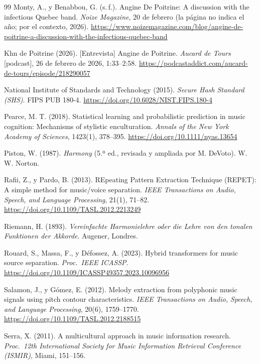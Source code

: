 \begin{thebibliography}{99}
Monty, A., y Benabbou, G. (s.\,f.). Angine De Poitrine: A discussion with the infectious Quebec band. \emph{Noize
Magazine}, 20 de febrero (la página no indica el año; por el contexto, 2026).
\url{https://www.noizemagazine.com/blog/angine-de-poitrine-a-discussion-with-the-infectious-quebec-band}

Khn de Poitrine (2026). [Entrevista] Angine de Poitrine. \emph{Aucard de Tours} [podcast], 26 de febrero de 2026,
1:33--2:58. \url{https://podcastaddict.com/aucard-de-tours/episode/218290057}

National Institute of Standards and Technology (2015). \emph{Secure Hash Standard (SHS)}. FIPS PUB 180-4.
\url{https://doi.org/10.6028/NIST.FIPS.180-4}

Pearce, M. T. (2018). Statistical learning and probabilistic prediction in music cognition: Mechanisms of stylistic
enculturation. \emph{Annals of the New York Academy of Sciences}, 1423(1), 378--395.
\url{https://doi.org/10.1111/nyas.13654}

Piston, W. (1987). \emph{Harmony} (5.ª ed., revisada y ampliada por M. DeVoto). W. W. Norton.

Rafii, Z., y Pardo, B. (2013). REpeating Pattern Extraction Technique (REPET): A simple method for music/voice
separation. \emph{IEEE Transactions on Audio, Speech, and Language Processing}, 21(1), 71--82.
\url{https://doi.org/10.1109/TASL.2012.2213249}

Riemann, H. (1893). \emph{Vereinfachte Harmonielehre oder die Lehre von den tonalen Funktionen der Akkorde}. Augener, Londres.

Rouard, S., Massa, F., y Défossez, A. (2023). Hybrid transformers for music source separation. \emph{Proc.\ IEEE
ICASSP}. \url{https://doi.org/10.1109/ICASSP49357.2023.10096956}

Salamon, J., y Gómez, E. (2012). Melody extraction from polyphonic music signals using pitch contour characteristics.
\emph{IEEE Transactions on Audio, Speech, and Language Processing}, 20(6), 1759--1770.
\url{https://doi.org/10.1109/TASL.2012.2188515}

Serra, X. (2011). A multicultural approach in music information research. \emph{Proc.\ 12th International Society for
Music Information Retrieval Conference (ISMIR)}, Miami, 151--156.


\end{thebibliography}
